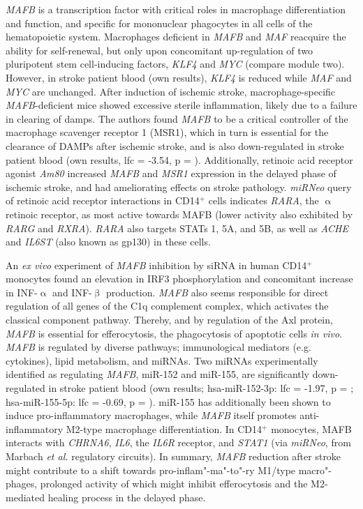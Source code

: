 \emph{MAFB} is a transcription factor with critical roles in macrophage differentiation and function, and specific for mononuclear phagocytes in all cells of the hematopoietic system.\cite{Hamada2020} Macrophages deficient in \emph{MAFB} and \emph{MAF} reacquire the ability for self-renewal, but only upon concomitant up-regulation of two pluripotent stem cell-inducing factors, \emph{KLF4} and \emph{MYC} (compare module two).\cite{Aziz2009} However, in stroke patient blood (own results), \emph{KLF4} is reduced while \emph{MAF} and \emph{MYC} are unchanged. After induction of ischemic stroke, macrophage-specific \emph{MAFB}-deficient mice showed excessive sterile inflammation, likely due to a failure in clearing of \acp{damp}.\cite{Shichita2017} The authors found \emph{MAFB} to be a critical controller of the macrophage scavenger receptor 1 (MSR1), which in turn is essential for the clearance of DAMPs after ischemic stroke, and is also down-regulated in stroke patient blood (own results, \ac{lfc} = -3.54, p = ). Additionally, retinoic acid receptor agonist \emph{Am80} increased \emph{MAFB} and \emph{MSR1} expression in the delayed phase of ischemic stroke, and had ameliorating effects on stroke pathology.\cite{Shichita2017} \emph{miRNeo} query of retinoic acid receptor interactions in CD14$^+$ cells indicates \emph{RARA}, the $\upalpha$ retinoic receptor, as most active towards MAFB (lower activity also exhibited by \emph{RARG} and \emph{RXRA}). \emph{RARA} also targets STATs 1, 5A, and 5B, as well as \emph{ACHE} and \emph{IL6ST} (also known as gp130) in these cells. 

An \emph{ex vivo} experiment of \emph{MAFB} inhibition by siRNA in human CD14$^+$ monocytes found an elevation in IRF3 phosphorylation and concomitant increase in INF-$\upalpha$ and INF-$\upbeta$ production.\cite{Liu2019} \emph{MAFB} also seems responsible for direct regulation of all genes of the C1q complement complex, which activates the classical component pathway.\cite{Tran2017} Thereby, and by regulation of the Axl protein, \emph{MAFB} is essential for efferocytosis, the phagocytosis of apoptotic cells \emph{in vivo}.\cite{Sato2018} \emph{MAFB} is regulated by diverse pathways; immunological mediators (e.g. cytokines), lipid metabolism, and miRNAs.\cite{Hamada2020} Two miRNAs experimentally identified as regulating \emph{MAFB}, miR-152\cite{Tozaki-Saitoh2019} and miR-155\cite{Jablonski2016}, are significantly down-regulated in stroke patient blood (own results; hsa-miR-152-3p: \ac{lfc} = -1.97, p = ; hsa-miR-155-5p: \ac{lfc} = -0.69, p = ). miR-155 has additionally been shown to induce pro-inflammatory macrophages, while \emph{MAFB} itself promotes anti-inflammatory M2-type macrophage differentiation.\cite{Kim2017} In CD14$^+$ monocytes, MAFB interacts with \emph{CHRNA6}, \emph{IL6}, the \emph{IL6R} receptor, and \emph{STAT1} (via \emph{miRNeo}, from Marbach \emph{et al.} regulatory circuits\cite{Marbach2016}). In summary, \emph{MAFB} reduction after stroke might contribute to a shift towards pro-inflam"-ma"-to"-ry M1\-/type macro"-phages, prolonged activity of which might inhibit efferocytosis and the M2-mediated healing process in the delayed phase.

